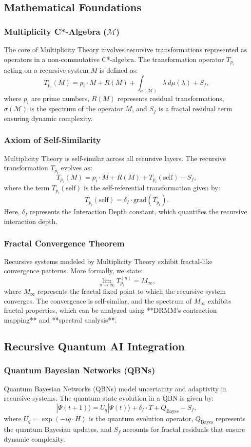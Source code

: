 \documentclass[12pt]{article}
\begin{document}
\subsection{Mathematical Foundations}

\subsubsection{Multiplicity C*-Algebra (\( \mathcal{M} \))}
The core of Multiplicity Theory involves recursive transformations represented as operators in a non-commutative C*-algebra. The transformation operator \( T_{p_i} \) acting on a recursive system \( M \) is defined as:
\[
T_{p_i}(M) = p_i \cdot M + R(M) + \int_{\sigma(\mathcal{M})} \lambda \, d\mu(\lambda) + S_f,
\]
where \( p_i \) are prime numbers, \( R(M) \) represents residual transformations, \( \sigma(\mathcal{M}) \) is the spectrum of the operator \( M \), and \( S_f \) is a fractal residual term ensuring dynamic complexity.
\subsubsection{Axiom of Self-Similarity}
Multiplicity Theory is self-similar across all recursive layers. The recursive transformation \( T_{p_i} \) evolves as:
\[
T_{p_i}(M) = p_i \cdot M + R(M) + T_{p_i}(\text{self}) + S_f,
\]
where the term \( T_{p_i}(\text{self}) \) is the self-referential transformation given by:
\[
T_{p_i}(\text{self}) = \delta_I \cdot \text{grad}(T_{p_i}).
\]
Here, \( \delta_I \) represents the Interaction Depth constant, which quantifies the recursive interaction depth.
\subsubsection{Fractal Convergence Theorem}
Recursive systems modeled by Multiplicity Theory exhibit fractal-like convergence patterns. More formally, we state:
\[
\lim_{n \to \infty} T_{p_i}^{(n)} = M_\infty,
\]
where \( M_\infty \) represents the fractal fixed point to which the recursive system converges. The convergence is self-similar, and the spectrum of \( M_\infty \) exhibits fractal properties, which can be analyzed using **DRMM's contraction mapping** and **spectral analysis**.
\subsection{Recursive Quantum AI Integration}

\subsubsection{Quantum Bayesian Networks (QBNs)}
Quantum Bayesian Networks (QBNs) model uncertainty and adaptivity in recursive systems. The quantum state evolution in a QBN is given by:
\[
|\Psi(t+1)\rangle = U_q |\Psi(t)\rangle + \delta_I \cdot T + Q_\text{Bayes} + S_f,
\]
where \( U_q = \exp(-i q \cdot H) \) is the quantum evolution operator, \( Q_\text{Bayes} \) represents the quantum Bayesian updates, and \( S_f \) accounts for fractal residuals that ensure dynamic complexity.
\end{document}
